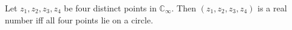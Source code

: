 Let $z_1, z_2, z_3, z_4$ be four distinct points in $\mathbb{C}_\infty$. Then $(z_1, z_2, z_3, z_4)$ is a real number iff all four points lie on a circle.